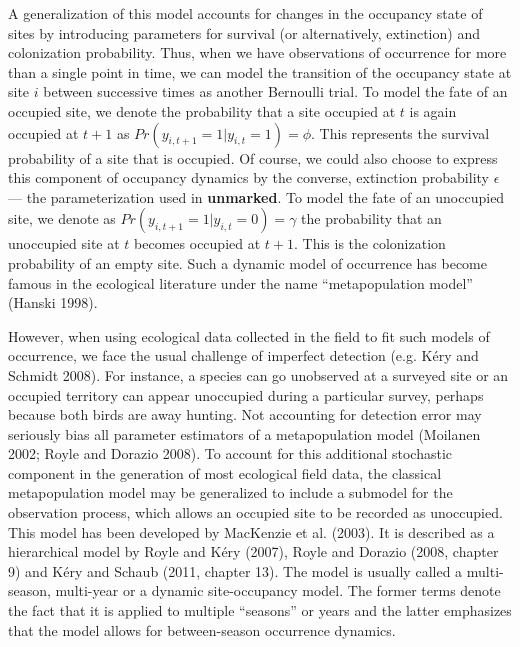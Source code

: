 \documentclass[12pt]{article}
\begin{document}
A generalization of this model accounts for changes in the occupancy
state of sites by introducing parameters for survival
(or alternatively, extinction) and colonization probability.
Thus, when we have observations of occurrence for more than a single
point in time, we can model the transition of the occupancy
state at site $i$ between successive times as another Bernoulli trial.
To model the fate of an occupied site, we denote the probability that
a site occupied at $t$ is again occupied at $t+1$ as $Pr(y_{i,t+1} = 1
| y_{i,t} = 1 ) = \phi$.
This represents the survival probability of a site that is occupied.
Of course, we could also choose to express this component of occupancy
dynamics by the converse, extinction probability $\epsilon$ ---
the parameterization used in \textbf{unmarked}.
To model the fate of an unoccupied site, we denote as $Pr(y_{i,t+1} =
1 | y_{i,t} = 0 ) = \gamma$ the probability that an unoccupied site at
$t$ becomes occupied at $t+1$.
This is the colonization probability of an empty site.
Such a dynamic model of occurrence has become famous in the ecological literature under the name ``metapopulation model'' (Hanski 1998).

However, when using ecological data collected in the field to fit such
models of occurrence, we face the usual challenge of imperfect
detection (e.g. K\'{e}ry and Schmidt 2008).
For instance, a species can go unobserved at a surveyed site or an
occupied territory can appear unoccupied during a particular survey,
perhaps because both birds are away hunting.
Not accounting for detection error may seriously bias all parameter
estimators of a metapopulation model (Moilanen 2002; Royle and Dorazio
2008).
To account for this additional stochastic component in the generation
of most ecological field data, the classical metapopulation model may
be generalized to include a submodel for the observation process,
which allows an occupied site to be recorded as unoccupied.
This model has been developed by MacKenzie et al. (2003). It is
described as a hierarchical model by Royle and K\'{e}ry (2007), Royle
and Dorazio (2008, chapter 9) and K\'{e}ry and Schaub (2011, chapter
13). The model is usually called a multi-season, multi-year or a
dynamic site-occupancy model.
The former terms denote the fact that it is applied to multiple
``seasons'' or years and the latter emphasizes that the model allows
for between-season occurrence dynamics.
\end{document}
